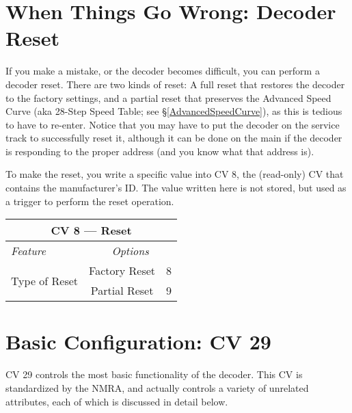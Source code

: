 \documentclass[12pt,letterpaper,draft]{memoir} %
\begin{document}
\section{When Things Go Wrong: Decoder Reset}
\label{DecoderReset}
If you make a mistake, or the decoder becomes difficult, you can perform a decoder reset. There are two kinds of reset: A full reset that restores the decoder to the factory settings, and a partial reset that preserves the Advanced Speed Curve (aka 28-Step Speed Table; see \S\ref{AdvancedSpeedCurve}), as this is tedious to have to re-enter. Notice that you may have to put the decoder on the service track to successfully reset it, although it can be done on the main if the decoder is responding to the proper address (and you know what that address is).

To make the reset, you write a specific value into CV 8, the (read-only) CV that contains the manufacturer's ID. The value written here is not stored, but used as a trigger to perform the reset operation.

\begin{center}
\begin{tabular}{|l|cc|}
\hline
\multicolumn{3}{|c|}{\textbf{CV 8 --- Reset}} \\ \hline \hline
\textit{Feature}& \multicolumn{2}{c|}{\textit{Options}}  \\ \hline
\multirow{2}{*}{Type of Reset}  & Factory Reset & 8\\ 
& Partial Reset & 9 \\ \hline
\end{tabular}
\end{center}

\section{Basic Configuration: CV 29}

CV 29 controls the most basic functionality of the decoder. This CV is standardized by the NMRA, and actually controls a variety of unrelated attributes, each of which is discussed in detail below.
\end{document}

